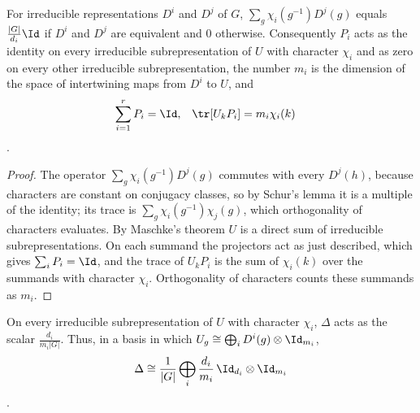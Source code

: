 \begin{lemma}%
    \label{thm:peps_isotypic_projectors}
    \leanok
    For irreducible representations $D^i$ and $D^j$ of $G$,
    $\sum_g\chi_i(g^{-1})D^j(g)$ equals $\frac{|G|}{d_i}\Id$ if $D^i$
    and $D^j$ are equivalent and $0$ otherwise. Consequently $P_i$ acts as
    the identity on every irreducible subrepresentation of $U$ with
    character $\chi_i$ and as zero on every other irreducible
    subrepresentation, the number $m_i$ is the dimension of the space of
    intertwining maps from $D^i$ to $U$, and
    \begin{align*}
        \sum_{i=1}^{r}P_i & =\Id, & \tr[U_kP_i] & =m_i\chi_i(k)
    \end{align*}
    \cite[Section~``MPS: the $G$-injective case'']{Schuch2010PEPS}.
\end{lemma}

\begin{proof}\leanok
    The operator $\sum_g\chi_i(g^{-1})D^j(g)$ commutes with every $D^j(h)$,
    because characters are constant on conjugacy classes, so by Schur's lemma
    it is a multiple of the identity; its trace is
    $\sum_g\chi_i(g^{-1})\chi_j(g)$, which orthogonality of characters
    evaluates. By Maschke's theorem $U$ is a direct sum of irreducible
    subrepresentations. On each summand the projectors act as just
    described, which gives $\sum_iP_i=\Id$, and the trace of
    $U_kP_i$ is the sum of $\chi_i(k)$ over the summands with character
    $\chi_i$. Orthogonality of characters counts these summands as $m_i$.
\end{proof}

\begin{lemma}%
    \label{thm:peps_delta_block_form}
    \leanok
    On every irreducible subrepresentation of $U$ with character $\chi_i$,
    $\Delta$ acts as the scalar $\frac{d_i}{m_i|G|}$. Thus, in a basis in which
    $U_g\cong\bigoplus_iD^i(g)\otimes\Id_{m_i}$,
    \begin{align*}
        \Delta\cong\frac{1}{|G|}\bigoplus_i\frac{d_i}{m_i}\,
        \Id_{d_i}\otimes\Id_{m_i}
    \end{align*}
    \cite[Section~``MPS: the $G$-injective case'']{Schuch2010PEPS}.
\end{lemma}

